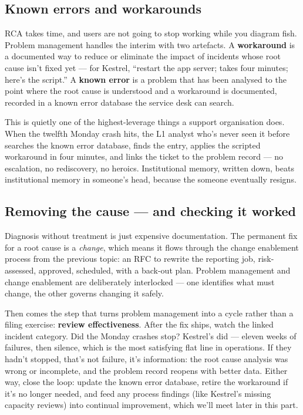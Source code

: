 \subsection{Known errors and workarounds}


RCA takes time, and users are not going to stop working while you diagram fish. Problem management handles the interim with two artefacts. A \textbf{workaround} is a documented way to reduce or eliminate the impact of incidents whose root cause isn't fixed yet — for Kestrel, ``restart the app server; takes four minutes; here's the script.'' A \textbf{known error} is a problem that has been analysed to the point where the root cause is understood and a workaround is documented, recorded in a known error database the service desk can search.


This is quietly one of the highest-leverage things a support organisation does. When the twelfth Monday crash hits, the L1 analyst who's never seen it before searches the known error database, finds the entry, applies the scripted workaround in four minutes, and links the ticket to the problem record — no escalation, no rediscovery, no heroics. Institutional memory, written down, beats institutional memory in someone's head, because the someone eventually resigns.



\subsection{Removing the cause — and checking it worked}


Diagnosis without treatment is just expensive documentation. The permanent fix for a root cause is a \emph{change}, which means it flows through the change enablement process from the previous topic: an RFC to rewrite the reporting job, risk-assessed, approved, scheduled, with a back-out plan. Problem management and change enablement are deliberately interlocked — one identifies what must change, the other governs changing it safely.


Then comes the step that turns problem management into a cycle rather than a filing exercise: \textbf{review effectiveness}. After the fix ships, watch the linked incident category. Did the Monday crashes stop? Kestrel's did — eleven weeks of failures, then silence, which is the most satisfying flat line in operations. If they hadn't stopped, that's not failure, it's information: the root cause analysis was wrong or incomplete, and the problem record reopens with better data. Either way, close the loop: update the known error database, retire the workaround if it's no longer needed, and feed any process findings (like Kestrel's missing capacity reviews) into continual improvement, which we'll meet later in this part.



